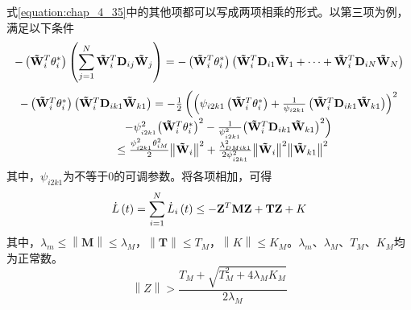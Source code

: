 式\ref{equation:chap_4_35}中的其他项都可以写成两项相乘的形式。以第三项为例，满足以下条件
\begin{equation}
   - \left( {{\bf{\tilde W}}_i^T{\bf{\theta }}_i^*} \right)\left( {\sum\limits_{j = 1}^N {{\bf{\tilde W}}_i^T{{\bf{D}}_{ij}}{{{\bf{\tilde W}}}_j}} } \right) =  - \left( {{\bf{\tilde W}}_i^T{\bf{\theta }}_i^*} \right)\left( {{\bf{\tilde W}}_i^T{{\bf{D}}_{i1}}{{{\bf{\tilde W}}}_1} +  \cdots  + {\bf{\tilde W}}_i^T{{\bf{D}}_{iN}}{{{\bf{\tilde W}}}_N}} \right)
\end{equation}
\begin{equation}
  \begin{array}{l}
    - \left( {{\bf{\tilde W}}_i^T{\bf{\theta }}_i^*} \right)\left( {{\bf{\tilde W}}_i^T{{\bf{D}}_{ik1}}{{{\bf{\tilde W}}}_{k1}}} \right) =  - \frac{1}{2}\left( {{{\left( {{\psi _{i2k1}}\left( {{\bf{\tilde W}}_i^T{\bf{\theta }}_i^*} \right) + \frac{1}{{{\psi _{i2k1}}}}\left( {{\bf{\tilde W}}_i^T{{\bf{D}}_{ik1}}{{{\bf{\tilde W}}}_{k1}}} \right)} \right)}^2}} \right.\\
   \;\;\;\;\;\;\;\;\;\;\;\;\;\;\;\;\;\;\;\;\;\;\;\;\;\;\;\;\;\;\;\;\;\left. { - \psi _{_{i2k1}}^2{{\left( {{\bf{\tilde W}}_i^T{\bf{\theta }}_i^*} \right)}^2} - \frac{1}{{\psi _{_{i2k1}}^2}}{{\left( {{\bf{\tilde W}}_i^T{{\bf{D}}_{ik1}}{{{\bf{\tilde W}}}_{k1}}} \right)}^2}} \right)\\
   \;\;\;\;\;\;\;\;\;\;\;\;\;\;\;\;\;\;\;\;\;\;\;\;\;\;\;\;\;\;\; \le \frac{{\psi _{_{i2k1}}^2\theta _{iM}^2}}{2}{\left\| {{{{\bf{\tilde W}}}_i}} \right\|^2} + \frac{{\lambda _{DMik1}^2}}{{2\psi _{_{i2k1}}^2}}{\left\| {{{{\bf{\tilde W}}}_i}} \right\|^2}{\left\| {{{{\bf{\tilde W}}}_{k1}}} \right\|^2}
   \end{array}
\end{equation}
其中，${\psi _{i2k1}}$为不等于0的可调参数。将各项相加，可得
\begin{equation}
  \dot L\left( t \right) = \sum\limits_{i = 1}^N {{{\dot L}_i}\left( t \right)}  \le  - {{\bf{Z}}^T}{\bf{MZ}} + {\bf{TZ}} + K
\end{equation}
其中，${\lambda _m} \leqslant \left\| {\mathbf{M}} \right\| \leqslant {\lambda _M}$，$\left\| {\mathbf{T}} \right\| \leqslant {T_M}$，$\left\| K \right\| \leqslant {K_M}$。${\lambda _m}$、${\lambda _M}$、${T_M}$、${K_M}$均为正常数。
\begin{equation}
  \left\| Z \right\| > \frac{{{T_M} + \sqrt {T_M^2 + 4{\lambda _M}{K_M}} }}{{2{\lambda _M}}}
  \label{equation:chap_4_42}
\end{equation}

